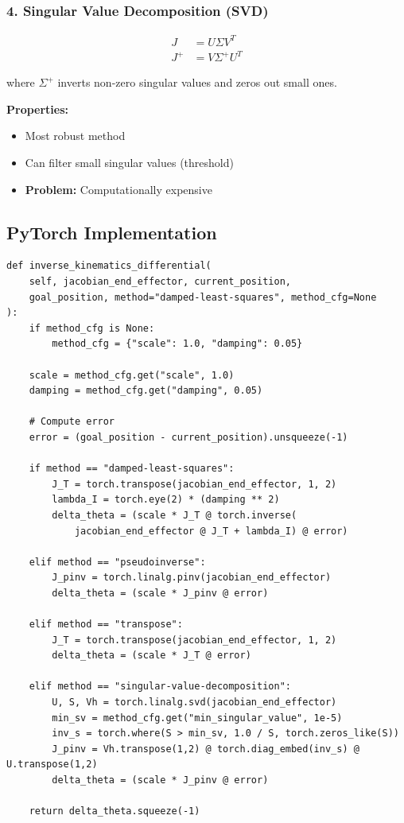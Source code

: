 \documentclass[11pt,a4paper]{article}
\begin{document}
\subsubsection{4. Singular Value Decomposition (SVD)}

\begin{align}
J &= U \Sigma V^T \\
J^+ &= V \Sigma^+ U^T
\end{align}

where $\Sigma^+$ inverts non-zero singular values and zeros out small ones.

\textbf{Properties:}
\begin{itemize}
    \item Most robust method
    \item Can filter small singular values (threshold)
    \item \textbf{Problem:} Computationally expensive
\end{itemize}

\subsection{PyTorch Implementation}

\begin{lstlisting}
def inverse_kinematics_differential(
    self, jacobian_end_effector, current_position, 
    goal_position, method="damped-least-squares", method_cfg=None
):
    if method_cfg is None:
        method_cfg = {"scale": 1.0, "damping": 0.05}
    
    scale = method_cfg.get("scale", 1.0)
    damping = method_cfg.get("damping", 0.05)
    
    # Compute error
    error = (goal_position - current_position).unsqueeze(-1)
    
    if method == "damped-least-squares":
        J_T = torch.transpose(jacobian_end_effector, 1, 2)
        lambda_I = torch.eye(2) * (damping ** 2)
        delta_theta = (scale * J_T @ torch.inverse(
            jacobian_end_effector @ J_T + lambda_I) @ error)
    
    elif method == "pseudoinverse":
        J_pinv = torch.linalg.pinv(jacobian_end_effector)
        delta_theta = (scale * J_pinv @ error)
    
    elif method == "transpose":
        J_T = torch.transpose(jacobian_end_effector, 1, 2)
        delta_theta = (scale * J_T @ error)
    
    elif method == "singular-value-decomposition":
        U, S, Vh = torch.linalg.svd(jacobian_end_effector)
        min_sv = method_cfg.get("min_singular_value", 1e-5)
        inv_s = torch.where(S > min_sv, 1.0 / S, torch.zeros_like(S))
        J_pinv = Vh.transpose(1,2) @ torch.diag_embed(inv_s) @ U.transpose(1,2)
        delta_theta = (scale * J_pinv @ error)
    
    return delta_theta.squeeze(-1)
\end{lstlisting}
\end{document}
